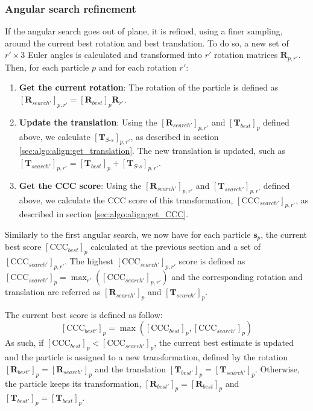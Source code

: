 \subsubsection{Angular search refinement}

If the angular search goes out of plane, it is refined, using a finer sampling, around the current best rotation and best translation. To do so, a new set of $r' \times 3$ Euler angles is calculated and transformed into $r'$ rotation matrices $\bm{R}_{p,r'}$. Then, for each particle $p$ and for each rotation $r'$:

\begin{enumerate}
    \item \textbf{Get the current rotation}: The rotation of the particle is defined as ${[\bm{R}_{search'}]}_{p,r'} = {[\bm{R}_{best}]}_p \bm{R}_{r'}$.

    \item \textbf{Update the translation}: Using the ${[\bm{R}_{search'}]}_{p,r'}$ and ${[\bm{T}_{best}]}_{p}$ defined above, we calculate ${[\bm{T}_{S\text{-}s}]}_{p,r'}$, as described in section \ref{sec:algo:align:get_translation}. The new translation is updated, such as ${[\bm{T}_{search'}]}_{p,r'} = {[\bm{T}_{best}]}_{p} + {[\bm{T}_{S\text{-}s}]}_{p,r'}$.
    
    \item \textbf{Get the CCC score}: Using the ${[\bm{R}_{search'}]}_{p,r'}$ and ${[\bm{T}_{search'}]}_{p,r'}$ defined above, we calculate the CCC score of this transformation, ${[\bm{\mathrm{CCC}}_{search'}]}_{p,r'}$, as described in section \ref{sec:algo:align:get_CCC}.
\end{enumerate}

Similarly to the first angular search, we now have for each particle $\bm{s}_p$, the current best score ${[\bm{\mathrm{CCC}}_{best}]}_{p}$ calculated at the previous section and a set of ${[\bm{\mathrm{CCC}}_{search'}]}_{p,r'}$. The highest ${[\bm{\mathrm{CCC}}_{search'}]}_{p,r'}$ score is defined as ${[\bm{\mathrm{CCC}}_{search'}]}_{p} = \max_{r'}({[\bm{\mathrm{CCC}}_{search'}]}_{p,r'})$ and the corresponding rotation and translation are referred as ${[\bm{R}_{search'}]}_p$ and ${[\bm{T}_{search'}]}_p$.

The current best score is defined as follow:
\begin{equation}
    {[\bm{\mathrm{CCC}}_{best'}]}_{p} = \max \left( {[\bm{\mathrm{CCC}}_{best}]}_{p}, {[\bm{\mathrm{CCC}}_{search'}]}_{p} \right)
\end{equation}
As such, if ${[\bm{\mathrm{CCC}}_{best}]}_{p} < {[\bm{\mathrm{CCC}}_{search'}]}_{p}$, the current best estimate is updated and the particle is assigned to a new transformation, defined by the rotation ${[\bm{R}_{best'}]}_p = {[\bm{R}_{search'}]}_p$ and the translation ${[\bm{T}_{best'}]}_p = {[\bm{T}_{search'}]}_p$. Otherwise, the particle keeps its transformation, ${[\bm{R}_{best'}]}_p = {[\bm{R}_{best}]}_p$ and ${[\bm{T}_{best'}]}_p = {[\bm{T}_{best}]}_p$.

